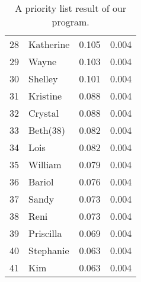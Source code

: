 \documentclass{icmmcm}
\begin{document}
\begin{table}[h!]
\begin{center}
\begin{tabular}{|@{}r@{}||l|c|@{}c@{}|}
28   	&Katherine    	& 0.105	&    0.004\\
29   	&Wayne        	& 0.103	&    0.004\\
30   	&Shelley      	& 0.101	&    0.004\\
31   	&Kristine     	& 0.088	&    0.004\\
32   	&Crystal      	& 0.088	&    0.004\\
33   	&Beth(38)     	& 0.082	&    0.004\\
34   	&Lois         	& 0.082	&    0.004\\
35   	&William      	& 0.079	&    0.004\\
36   	&Bariol       	& 0.076	&    0.004\\
37   	&Sandy        	& 0.073	&    0.004\\
38   	&Reni         	& 0.073	&    0.004\\
39   	&Priscilla    	& 0.069	&    0.004\\
40   	&Stephanie    	& 0.063	&    0.004\\
41   	&Kim          	& 0.063	&    0.004\\
\hline
 \bottomrule	
    \end{tabular}
  \end{center}
  \caption[A Result of the Priority List]
  {A priority list result of our program.}
  \label{tab:priority}
\end{table}
\end{document}
